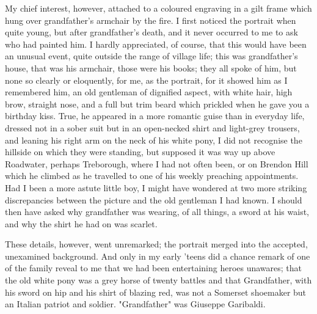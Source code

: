 My chief interest, however, attached to a coloured engraving in a gilt frame which hung over grandfather’s armchair by the fire. I first noticed the portrait when quite young, but after grandfather's death, and it never occurred to me to ask who had painted him. I hardly appreciated, of course, that this would have been an unusual event, quite outside the range of village life; this was grandfather's house, that was his armchair, those were his books; they all spoke of him, but none so clearly or eloquently, for me, as the portrait, for it showed him as I remembered him, an old gentleman of dignified aspect, with white hair, high brow, straight nose, and a full but trim beard which prickled when he gave you a birthday kiss. True, he appeared in a more romantic guise than in everyday life, dressed not in a sober suit but in an open-necked shirt and light-grey trousers, and leaning his right arm on the neck of his white pony, I did not recognise the hillside on which they were standing, but supposed it was way up above Roadwater, perhaps Treborough, where I had not often been, or on Brendon Hill which he climbed as he travelled to one of his weekly preaching appointments. Had I been a more astute little boy, I might have wondered at two more striking discrepancies between the picture and the old gentleman I had known. I should then have asked why grandfather was wearing, of all things, a sword at his waist, and why the shirt he had on was scarlet.

These details, however, went unremarked; the portrait merged into the accepted, unexamined background. And only in my early 'teens did a chance remark of one of the family reveal to me that we had been entertaining heroes unawares; that the old white pony was a grey horse of twenty battles and that Grandfather, with his sword on hip and his shirt of blazing red, was not a Somerset shoemaker but an Italian patriot and soldier. "Grandfather" was Giuseppe Garibaldi.

